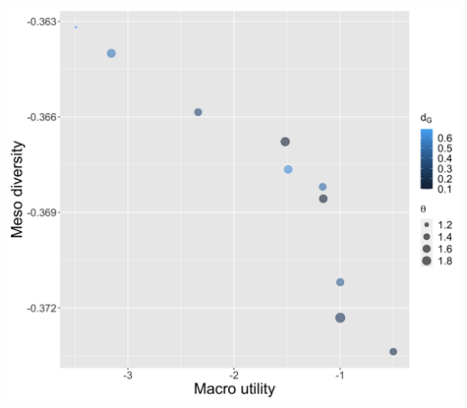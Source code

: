 \documentclass[a0paper]{tikzposter}
\begin{document}
\begin{columns}
{           \parbox{0.5\linewidth}{
              
              \includegraphics[width=\linewidth]{../figures/paretoDiversity-Fitness_colordG_sizetheta}
 
              
		      }
            \hspace{0.5cm}
            \parbox{0.48\linewidth}{
			    
			    
}}
\end{columns}
\end{document}
